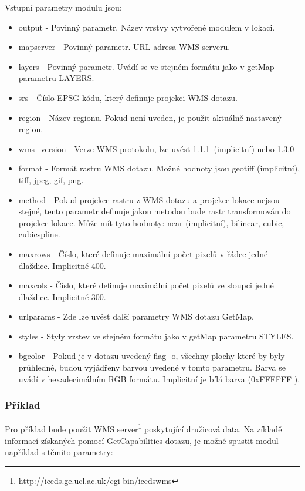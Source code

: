 \documentclass[a4paper,12pt]{article}
\begin{document}
Vstupní parametry modulu jsou:
\begin{itemize}
  \item output - Povinný parametr. Název vrstvy vytvořené modulem v
    lokaci.
  \item mapserver - Povinný parametr. URL adresa WMS serveru.
  \item layers - Povinný parametr. Uvádí se ve stejném formátu jako v
   getMap parametru LAYERS.
 \item srs - Číslo EPSG kódu, který definuje projekci WMS dotazu.
 \item region - Název regionu. Pokud není uveden, je použit aktuálně
   nastavený region.
 \item wms\_version - Verze WMS protokolu, lze uvést
   1.1.1\ (implicitní) nebo 1.3.0
 \item format - Formát rastru WMS dotazu. Možné hodnoty jsou geotiff
   (implicitní), tiff, jpeg, gif, png.
 \item method - Pokud projekce rastru z WMS dotazu a projekce lokace
   nejsou stejné, tento parametr definuje jakou metodou bude rastr
   transformován do projekce lokace. Může mít tyto hodnoty: near
   (implicitní), bilinear, cubic, cubicspline.

 \item maxrows - Číslo, které definuje maximální počet pixelů v řádce
   jedné dlaždice. Implicitně 400.
 \item maxcols - Číslo, které definuje maximální počet pixelů ve
   sloupci jedné dlaždice. Implicitně 300.
 \item urlparams - Zde lze uvést další parametry WMS dotazu GetMap.
 \item styles - Styly vrstev ve stejném formátu jako v getMap
   parametru STYLES.
 \item bgcolor - Pokud je v dotazu uvedený flag -o, všechny plochy
   které by byly průhledné, budou vyjádřeny barvou uvedené v tomto
   parametru. Barva se uvádí v hexadecimálním RGB formátu. Implicitní
   je bílá barva (0xFFFFFF ).
\end{itemize}

\subsubsection{Příklad}

Pro příklad bude použit WMS
server\footnote{\url{http://iceds.ge.ucl.ac.uk/cgi-bin/icedswms}}
poskytující družicová data. Na zíkladě informací získaných pomocí
GetCapabilities dotazu, je možné spustit modul například s těmito
parametry:
\end{document}
